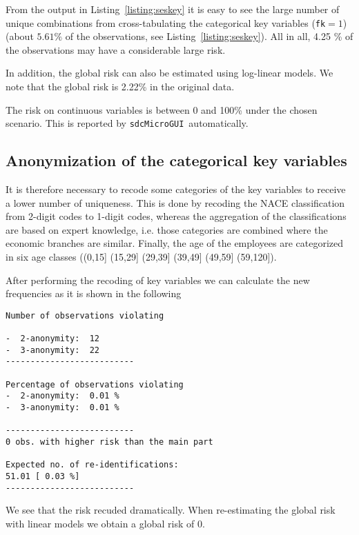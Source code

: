 \documentclass[12pt]{scrartcl}\usepackage[]{graphicx}\usepackage[]{color}
\newcommand{\sdcMicroGUI}{\texttt{sdcMicroGUI}}
\begin{document}
From the output in Listing~\ref{listing:seskey} it is easy to see the large number of unique combinations from cross-tabulating the categorical key variables (\texttt{fk$=1$}) (about $5.61\%$ of the observations, see Listing~\ref{listing:seskey}).
All in all, 4.25 \%  of the observations may have a considerable large risk.

In addition, the global risk can also be estimated using log-linear models. We note that the global risk is 2.22\% in the original data.

The risk on continuous variables is between 0 and 100\% under the chosen scenario. This is reported by \sdcMicroGUI \ automatically.


\subsection{Anonymization of the categorical key variables}
It is therefore necessary to recode some categories of the key variables to receive a lower number of uniqueness. This is done by recoding the NACE classification from 2-digit codes to 1-digit codes, whereas the aggregation of the classifications are based on expert knowledge, i.e. those categories are combined where the economic branches are similar. Finally, the age of the employees are categorized in six age classes ((0,15] (15,29]  (29,39]  (39,49]  (49,59] (59,120]).

After performing the recoding of key variables we can calculate the new frequencies as it is shown in the following

\begin{lstlisting}[numbers=none,captionpos=b, caption={Frequency calculation after recoding}]
Number of observations violating

-  2-anonymity:  12
-  3-anonymity:  22
--------------------------

Percentage of observations violating
-  2-anonymity:  0.01 %
-  3-anonymity:  0.01 %

--------------------------
0 obs. with higher risk than the main part

Expected no. of re-identifications:
51.01 [ 0.03 %]
--------------------------
\end{lstlisting}
 

We see that the risk recuded dramatically. When re-estimating the global risk with linear models we obtain a global risk of 0.
\end{document}
